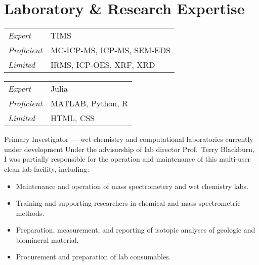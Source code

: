 \section{Laboratory \& Research Expertise}

\begin{tabular}{l l}
	\itshape Expert & TIMS \\
	\itshape Proficient & MC-ICP-MS, ICP-MS, SEM-EDS \\
	\itshape Limited & IRMS, ICP-OES, XRF, XRD
\end{tabular}

\begin{tabular}{ll}
	\itshape Expert & Julia \\
	\itshape Proficient & MATLAB, Python, R \\
	\itshape Limited & HTML, CSS
\end{tabular}

Primary Investigator --- wet chemistry and computational laboratories currently under development
Under the advisorship of lab director Prof.~Terry Blackburn, I was partially responsible for the operation and maintenance of this multi-user clean lab facility, including:
	\begin{itemize} 
	\item Maintenance and operation of mass spectrometery and wet chemistry labs.
	\item Training and supporting researchers in chemical and mass spectrometric methods.
	\item Preparation, measurement, and reporting of isotopic analyses of geologic and biomineral material.
	\item Procurement and preparation of lab consumables.
	\end{itemize}